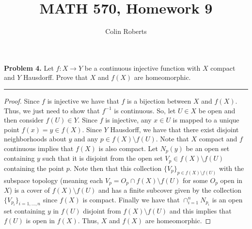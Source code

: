 \documentclass[leqno]{article}
\author{Colin Roberts}
\title{MATH 570, Homework 9}
\theoremstyle{nonumberplain}
\newtheorem{proof}{Proof}
\begin{document}
\noindent\textbf{Problem 4.} Let $f\colon X\to Y$ be a continuous injective function with $X$ compact and $Y$ Hausdorff. Prove that $X$ and $f(X)$ are homeomorphic.

\noindent\rule[0.5ex]{\linewidth}{1pt}

\begin{proof}
Since $f$ is injective we have that $f$ is a bijection between $X$ and $f(X)$.  Thus, we just need to show that $f^{-1}$ is continuous.  So, let $U\in X$ be open and then consider $f(U)\in Y$.  Since $f$ is injective, any $x\in U$ is mapped to a unique point $f(x)=y \in f(X)$.  Since $Y$ Hausdorff, we have that there exist disjoint neighborhoods about $y$ and any $p\in f(X)\setminus f(U)$. Note that $X$ compact and $f$ continuous implies that $f(X)$ is also compact. Let $N_p (y)$ be an open set containing $y$ such that it is disjoint from the open set $V_p \in f(X)\setminus f(U)$ containing the point $p$.  Note then that this collection $\{V_p\}_{p\in f(X)\setminus f(U)}$ with the subspace topology (meaning each $V_p=O_p \cap f(X)\setminus f(U)$ for some $O_p$ open in $X$) is a cover of $f(X)\setminus f(U)$ and has a finite subcover given by the collection $\{V_{p_i}\}_{i=1,\dots, n}$ since $f(X)$ is compact. Finally we have that $\cap_{i=1}^n N_{p_i}$ is an open  set containing $y$ in $f(U)$ disjoint from $f(X)\setminus f(U)$ and this implies that $f(U)$ is open in $f(X)$. Thus, $X$ and $f(X)$ are homeomorphic.
\end{proof}



\pagebreak
\end{document}
